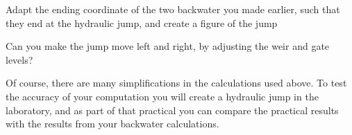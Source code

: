 \documentclass[a4paper]{article}
\begin{document}
\begin{exercise}
  Adapt the ending coordinate of the two backwater you made earlier, such that they end at the hydraulic jump, and create a figure of the jump
\end{exercise}

\begin{exercise}
  Can you make the jump move left and right, by adjusting the weir and gate levels?
\end{exercise}

Of course, there are many simplifications in the calculations used above. To test the accuracy of your computation you will create a hydraulic jump in the laboratory, and as part of that practical you can compare the practical results with the results from your backwater calculations.

\printsolutions
\end{document}
